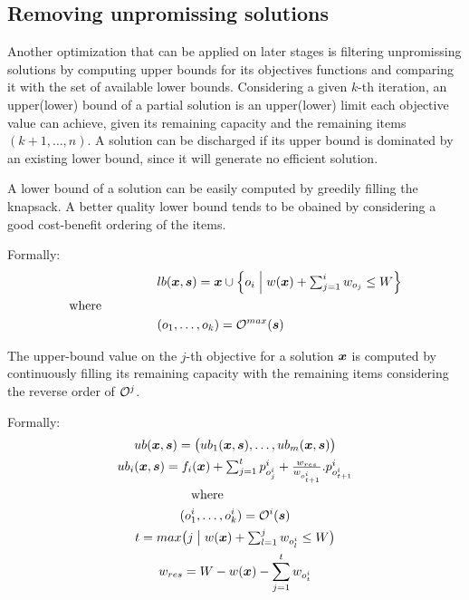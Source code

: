 \subsection{Removing unpromissing solutions}

Another optimization that can be applied on later stages is
filtering unpromissing solutions by computing upper bounds for its objectives
functions and comparing it with the set of available lower bounds.
Considering a given $k$-th iteration, an upper(lower) bound of a partial solution
is an upper(lower) limit each objective value can achieve,
given its remaining capacity and the remaining items $(k+1, \ldots, n)$.
A solution can be discharged if its upper bound is dominated by an existing lower bound, since it will generate no efficient solution.

A lower bound of a solution can be easily computed by greedily filling the
knapsack.
A better quality lower bound tends to be obained by considering a good
cost-benefit ordering of the items.

Formally:
\begin{align*}
    &lb(\boldsymbol{x}, \boldsymbol{s}) = \boldsymbol{x} \cup
      \left\{ o_i \;\middle|\; w(\boldsymbol{x}) + \textstyle\sum_{j=1}^i w_{o_j} \leq W \right\} \\
  \text{where} \phantom{mmmmm} \\
    &(o_1, \ldots, o_k) = \mathcal{O}^{max}(\boldsymbol{s}) \\
\end{align*}

The upper-bound value on the $j$-th objective for a solution $\boldsymbol{x}$ is
computed by continuously filling its remaining capacity with the remaining
items considering the reverse order of $\mathcal{O}^j$.

Formally:
\begin{gather*}
    ub(\boldsymbol{x}, \boldsymbol{s}) = \big(ub_1(\boldsymbol{x}, \boldsymbol{s}), \ldots, ub_m(\boldsymbol{x}, \boldsymbol{s})\big) \\
    ub_i(\boldsymbol{x}, \boldsymbol{s}) = f_i(\boldsymbol{x}) + \textstyle\sum^t_{j=1} p^i_{o^i_j} + \frac{w_{res}}{w_{o^i_{t+1}}}.p^i_{o^i_{t+1}}\\
  \text{where} \phantom{mmmmm} \\
    (o^i_1, \ldots, o^i_k) = \mathcal{O}^i(\boldsymbol{s}) \\
    t = max\big( j \;\big|\; w(\boldsymbol{x}) + \textstyle\sum_{l = 1}^j w_{o^i_l} \leq W \big) \\
    w_{res} = W - w(\boldsymbol{x}) - \sum^t_{j=1}w_{o^i_t}
\end{gather*}

